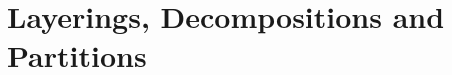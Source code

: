 \documentclass{patmorin}
\begin{document}









\section{Layerings, Decompositions and Partitions}
\label{Tools}
\end{document}
